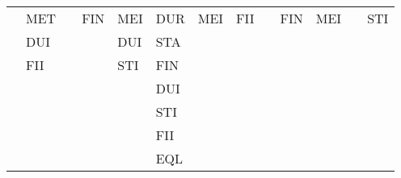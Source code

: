 \documentclass[11pt]{report}
\newenvironment{vvarmargin}[2]
{
  \begin{list}{}
  {
    \setlength{\topsep}{0pt}
    \setlength{\leftmargin}{0pt}
    \setlength{\rightmargin}{0pt}
    \setlength{\listparindent}{\parindent}
    \setlength{\itemindent}{\parindent}
    \setlength{\parsep}{0pt plus 1pt}
    \addtolength{\leftmargin}{#1}\addtolength{\rightmargin}{#2}
  }
  \item
}
{
  \end{list}
}
\begin{document}
\begin{table}[p]
\begin{vvarmargin}{-4cm}{-4cm}
\begin{center}
\begin{tabular}[t]{|r|l|l|l|l|l|l|l|l|l|l|l|l|}
                                        & MET                     &                         & FIN                     & MEI                     & DUR                     & MEI                     & FII                     &                         & FIN                     & MEI                     &                         & STI                     \\
                                        & DUI                     &                         &                         & DUI                     & STA                     &                         &                         &                         &                         &                         &                         &                         \\
                                        & FII                     &                         &                         & STI                     & FIN                     &                         &                         &                         &                         &                         &                         &                         \\
                                        &                         &                         &                         &                         & DUI                     &                         &                         &                         &                         &                         &                         &                         \\
                                        &                         &                         &                         &                         & STI                     &                         &                         &                         &                         &                         &                         &                         \\
                                        &                         &                         &                         &                         & FII                     &                         &                         &                         &                         &                         &                         &                         \\
                                        &                         &                         &                         &                         & EQL                     &                         &                         &                         &                         &                         &                         &                         \\

\end{tabular}
\end{center}
\end{vvarmargin}
\end{table}
\end{document}
